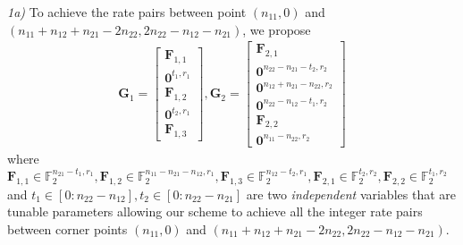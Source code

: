 \documentclass[12pt, draftclsnofoot, onecolumn]{IEEEtran}
\theoremstyle{definition}
\begin{document}
\emph{1a) }To achieve the rate pairs between point $(n_{11},0)$ and $(n_{11}+n_{12}+n_{21}-2n_{22},2n_{22} - n_{12}- n_{21} )$, we propose
\begin{align}\label{eq:1aE}
\boldsymbol{G}_1 = \begin{bmatrix}
\boldsymbol{F}_{1,1}\\
\boldsymbol{0}^{t_1,r_1} \\
\boldsymbol{F}_{1,2}\\
\boldsymbol{0}^{t_2,r_1}\\
\boldsymbol{F}_{1,3}
\end{bmatrix},
\boldsymbol{G}_2 = \begin{bmatrix}
\boldsymbol{F}_{2,1}\\
\boldsymbol{0}^{n_{22}-n_{21}-t_2,r_2}\\
\boldsymbol{0}^{n_{12}+n_{21}-n_{22},r_2}\\
\boldsymbol{0}^{n_{22}-n_{12}-t_1,r_2}\\
\boldsymbol{F}_{2,2} \\
\boldsymbol{0}^{n_{11}-n_{22},r_2}
\end{bmatrix}
\end{align}
where $\boldsymbol{F}_{1,1} \in \mathbb{F}_2^{n_{21}-t_1,r_1},\boldsymbol{F}_{1,2} \in \mathbb{F}_2^{n_{11}-n_{21}-n_{12},r_1},\boldsymbol{F}_{1,3}\in \mathbb{F}_2^{n_{12}-t_2,r_1},\boldsymbol{F}_{2,1}\in \mathbb{F}_2^{t_2,r_2},\boldsymbol{F}_{2,2}\in \mathbb{F}_2^{t_1,r_2}$
and $t_1 \in [0:n_{22}-n_{12}],t_2 \in [0:n_{22}-n_{21}]$ are two \emph{independent} variables that are tunable parameters allowing our scheme to achieve all the integer rate pairs between corner points $(n_{11},0)$ and $(n_{11}+n_{12}+n_{21}-2n_{22},2n_{22} - n_{12}- n_{21} )$.
\end{document}
